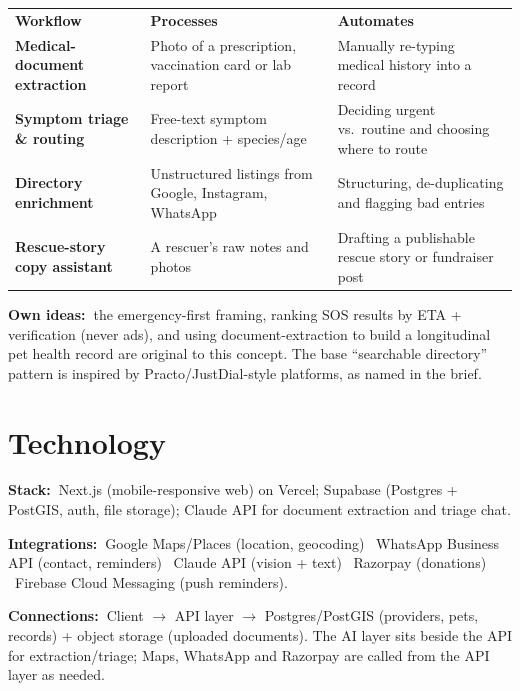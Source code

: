 \documentclass[11pt]{article}
\newcommand{\keyline}[2]{{\sffamily\bfseries\footnotesize\color{inksoft}#1\ }#2}
\begin{document}
\begin{center}
\renewcommand{\arraystretch}{1.25}
\begin{tabularx}{\textwidth}{@{}>{\sffamily\bfseries\small}p{3.6cm} >{\small}X >{\small}X@{}}
\rowcolor{tealtint}
\textcolor{tealdeep}{Workflow} & \textcolor{tealdeep}{\sffamily\bfseries Processes} & \textcolor{tealdeep}{\sffamily\bfseries Automates} \\
Medical-document extraction & Photo of a prescription, vaccination card or lab report & Manually re-typing medical history into a record \\
Symptom triage \& routing & Free-text symptom description + species/age & Deciding urgent vs.\ routine and choosing where to route \\
Directory enrichment & Unstructured listings from Google, Instagram, WhatsApp & Structuring, de-duplicating and flagging bad entries \\
Rescue-story copy assistant & A rescuer's raw notes and photos & Drafting a publishable rescue story or fundraiser post \\
\end{tabularx}
\end{center}

\keyline{Own ideas:}{the emergency-first framing, ranking SOS results by ETA + verification (never ads), and using document-extraction to build a longitudinal pet health record are original to this concept. The base ``searchable directory'' pattern is inspired by Practo/JustDial-style platforms, as named in the brief.}

\section{Technology}

\keyline{Stack:}{Next.js (mobile-responsive web) on Vercel; Supabase (Postgres + PostGIS, auth, file storage); Claude API for document extraction and triage chat.}

\keyline{Integrations:}{Google Maps/Places (location, geocoding) \textbullet\ WhatsApp Business API (contact, reminders) \textbullet\ Claude API (vision + text) \textbullet\ Razorpay (donations) \textbullet\ Firebase Cloud Messaging (push reminders).}

\keyline{Connections:}{Client $\rightarrow$ API layer $\rightarrow$ Postgres/PostGIS (providers, pets, records) + object storage (uploaded documents). The AI layer sits beside the API for extraction/triage; Maps, WhatsApp and Razorpay are called from the API layer as needed.}
\end{document}
